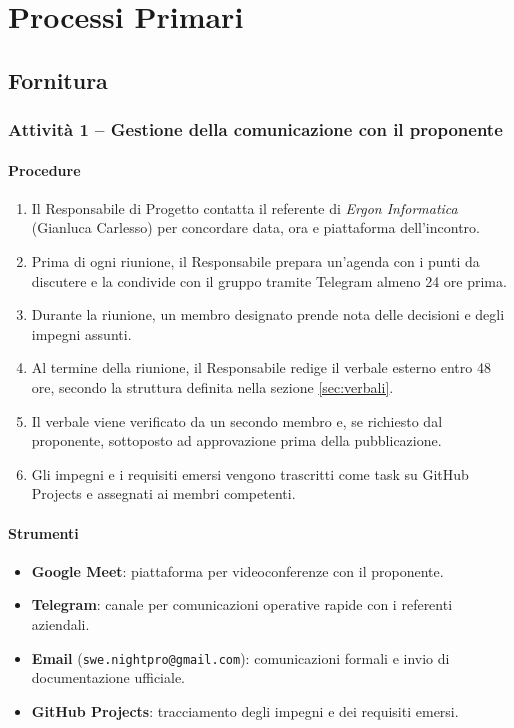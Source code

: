 \documentclass[a4paper, 11pt, oneside]{scrartcl}
\begin{document}
\newpage
\section{Processi Primari}

\subsection{Fornitura}

\subsubsection{Attività 1 – Gestione della comunicazione con il proponente}

\paragraph{Procedure}
\begin{enumerate}
    \item Il Responsabile di Progetto contatta il referente di \textit{Ergon Informatica} (Gianluca Carlesso) per concordare data, ora e piattaforma dell'incontro.
    \item Prima di ogni riunione, il Responsabile prepara un'agenda con i punti da discutere e la condivide con il gruppo tramite Telegram almeno 24 ore prima.
    \item Durante la riunione, un membro designato prende nota delle decisioni e degli impegni assunti.
    \item Al termine della riunione, il Responsabile redige il verbale esterno entro 48 ore, secondo la struttura definita nella sezione \ref{sec:verbali}.
    \item Il verbale viene verificato da un secondo membro e, se richiesto dal proponente, sottoposto ad approvazione prima della pubblicazione.
    \item Gli impegni e i requisiti emersi vengono trascritti come task su GitHub Projects e assegnati ai membri competenti.
\end{enumerate}

\paragraph{Strumenti}
\begin{itemize}
    \item \textbf{Google Meet}: piattaforma per videoconferenze con il proponente.
    \item \textbf{Telegram}: canale per comunicazioni operative rapide con i referenti aziendali.
    \item \textbf{Email} (\texttt{swe.nightpro@gmail.com}): comunicazioni formali e invio di documentazione ufficiale.
    \item \textbf{GitHub Projects}: tracciamento degli impegni e dei requisiti emersi.
\end{itemize}
\end{document}
